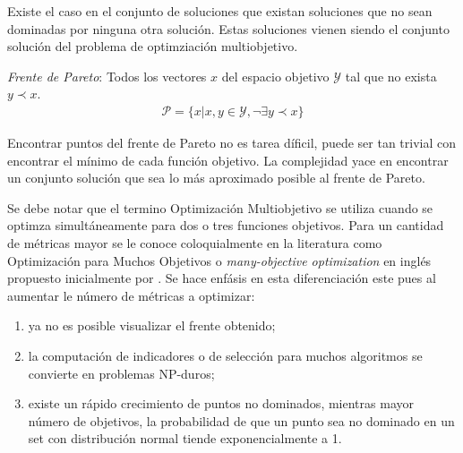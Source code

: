 Existe el caso en el conjunto de soluciones que existan soluciones que no sean dominadas por ninguna otra soluci\'on. Estas soluciones vienen siendo el conjunto soluci\'on del problema de optimziaci\'on multiobjetivo.


\begin{definition}
    \textit{Frente de Pareto}: Todos los vectores $x$ del espacio objetivo $\mathcal{Y}$ tal que no exista $y \prec x$.
    \begin{align*}
        \mathcal{P} = \{x| x, y \in \mathcal{Y}, \neg \exists y \prec x \} 
    \end{align*}
\end{definition}

Encontrar puntos del frente de Pareto no es tarea d\'ificil, puede ser tan trivial con encontrar el m\'inimo de cada funci\'on objetivo. La complejidad yace en encontrar un conjunto soluci\'on que sea lo m\'as aproximado posible al frente de Pareto.

Se debe notar que el termino Optimizaci\'on Multiobjetivo se utiliza cuando se optimza simult\'aneamente para dos o tres funciones objetivos. Para un cantidad de m\'etricas mayor se le conoce coloquialmente en la literatura como Optimizaci\'on para Muchos Objetivos o \textit{many-objective optimization} en ingl\'es propuesto inicialmente por \cite{10.1007/978-3-540-31880-4_2}. Se hace enf\'asis en esta  diferenciaci\'on este pues al aumentar le n\'umero de m\'etricas a optimizar:
\begin{enumerate}
    \item ya no es posible visualizar el frente obtenido;
    \item la computaci\'on de indicadores o de selecci\'on para muchos algoritmos se convierte en problemas NP-duros;
    \item existe un r\'apido crecimiento de puntos no dominados, mientras mayor n\'umero de objetivos, la probabilidad de que un punto sea no dominado en un set con distribuci\'on normal tiende exponencialmente a 1.
\end{enumerate}

